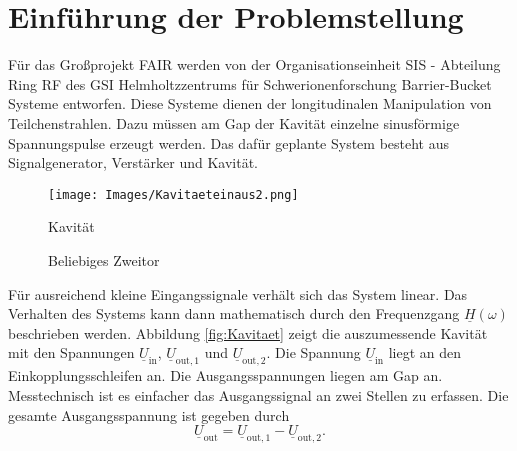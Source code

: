 \documentclass[12pt,report,final,twoside,accentcolor=tud9b,bigchapter]{tudreport}
\begin{document}
\chapter{Einführung der Problemstellung} \label{cha:einfuehrung}

Für das Großprojekt FAIR werden von der Organisationseinheit SIS - Abteilung Ring RF des GSI Helmholtzzentrums für Schwerionenforschung Barrier-Bucket Systeme entworfen. Diese Systeme dienen der longitudinalen Manipulation von Teilchenstrahlen. Dazu müssen am Gap der Kavität einzelne sinusförmige Spannungspulse erzeugt werden. Das dafür geplante System besteht aus Signalgenerator, Verstärker und Kavität. 
\begin{figure}[htb] 
\begin{minipage}[t]{0.48\linewidth}     
  \centering
  \texttt{[image: Images/Kavitaeteinaus2.png]}  
  \caption{Kavität}
  \label{fig:Kavitaet}
\end{minipage}
  \hfill
\begin{minipage}[t]{0.48\linewidth}     
  \centering
{}
\caption{Beliebiges Zweitor}
\label{fig:zweitor}
\end{minipage}
\end{figure}
Für ausreichend kleine Eingangssignale verhält sich das System linear. Das Verhalten des Systems kann dann mathematisch durch den Frequenzgang $\underline{H}(\omega)$ beschrieben werden. Abbildung \ref{fig:Kavitaet} zeigt die auszumessende Kavität mit den Spannungen $\underline{U}_\mathrm{in}$, $\underline{U}_\mathrm{out,1}$ und $\underline{U}_\mathrm{out,2}$. Die Spannung $\underline{U}_\mathrm{in}$ liegt an den Einkopplungsschleifen an. Die Ausgangsspannungen liegen am Gap an. Messtechnisch ist es einfacher das Ausgangssignal an zwei Stellen zu erfassen. Die gesamte Ausgangsspannung ist gegeben durch
\begin{equation}
\underline{U}_\mathrm{out} = \underline{U}_\mathrm{out,1} - \underline{U}_\mathrm{out,2}.
\end{equation}
\end{document}
